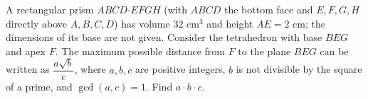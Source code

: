 A rectangular prism $ABCD$-$EFGH$ (with $ABCD$ the bottom face and $E,F,G,H$ directly above $A,B,C,D$) has volume $32\text{ cm}^3$ and height $AE=2\text{ cm}$; the dimensions of its base are not given. Consider the tetrahedron with base $BEG$ and apex $F$. The maximum possible distance from $F$ to the plane $BEG$ can be written as $\dfrac{a\sqrt b}{c}$, where $a,b,c$ are positive integers, $b$ is not divisible by the square of a prime, and $\gcd(a,c)=1$. Find $a\cdot b\cdot c$.
